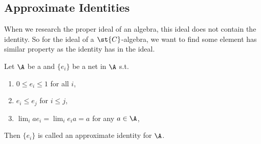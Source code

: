 \subsection{Approximate Identities}

When we research the proper ideal of an algebra, this ideal does not contain the identity. So for the ideal of a $\st{C}$-algebra, we want to find some element has similar property as the identity has in the ideal.

\begin{defn}
	Let $\A$ be a \Cs and $\{e_i\}$ be a net in $\A$ s.t.
	\begin{enumerate}[label=\arabic*)]
		\item $0 \leqslant e_i \leqslant 1$ for all $i$,
		\item $e_i \leqslant e_j$ for $i \leqslant j$,
		\item $\lim_{i} ae_i = \lim_{i} e_ia = a$ for any $a \in \A$,
	\end{enumerate}
	Then $\{e_i\}$ is called an approximate identity for $\A$.
\end{defn}

